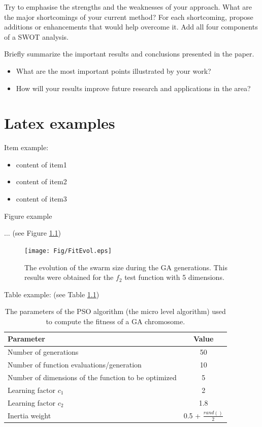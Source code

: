\documentclass[runningheads,a4paper,11pt]{report}
\begin{document}
Try to emphasise the strengths and the weaknesses of your approach.
What are the major shortcomings of your current method? For each shortcoming, propose additions or enhancements that would help overcome it. Add all four components of a SWOT analysis. 

Briefly summarize the important results and conclusions presented in the paper. 

\begin{itemize}
	\item What are the most important points illustrated by your work? 
	\item How will your results improve future research and applications in the area? 
\end{itemize}


\chapter{Latex examples}

Item example: 

\begin{itemize}
	\item content of item1
 	\item content of item2
 	\item content of item3
\end{itemize}



Figure example 

$\ldots$ (see Figure \ref{swarmsize})

\begin{figure}[htbp]
	\centerline{\texttt{[image: Fig/FitEvol.eps]}}  
	\caption{The evolution of the swarm size during the GA generations. This results were obtained for the $f_2$ test function with 5 dimensions.}
	\label{swarmsize}
\end{figure}


Table example: (see Table \ref{tab3PSO})


\begin{table}[htbp]
	\caption{The parameters of the PSO algorithm (the micro level algorithm) used to compute the fitness of a GA chromosome.}
	\label{tab3PSO}
		\begin{center}
			\begin{tabular}{p{220pt}c}

				\textbf{Parameter}& \textbf{Value} \\
				\hline\hline
 				Number of generations& 50 \\
 				Number of function evaluations/generation& 10 \\
 				Number of dimensions of the function to be optimized& 5 \\
 				Learning factor $c_{1}$& 2 \\
 				Learning factor $c_{2}$ & 1.8\\
 				Inertia weight& 0.5 + $\frac{rand()}{2}$\\
		
			\end{tabular}
		\end{center}
\end{table}
\end{document}

